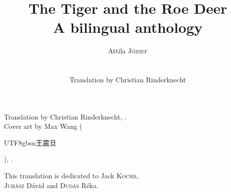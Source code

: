 \documentclass[11pt]{extbook}
\title{The Tiger and the Roe Deer\\ {\large A bilingual anthology}}
\author{{\Large Attila \textsc{József}}\\\\\\
Translation by Christian Rinderknecht}
\date{\oldstylenums{2026}}
\makeatletter
\newcommand*{\centeredornament}{\centerline{\pgfornament[width=6cm]{88}}}
\renewcommand{\tableofcontents}{%
  \def\contentsname{\empty}
  \chapter*{\contentsname}%
  \vspace*{-10em} %
  \@starttoc{toc}%
}
\newcommand{\zh}[1]{\begin{CJK}{UTF8}{gbsn}#1\end{CJK}}
\makeatother
\begin{document}
\pagestyle{empty}



\mbox{}

\newpage

\mbox{}

\newpage

\maketitle

\vspace*{\fill}

\begin{flushright}
  \textcopyright{} Translation by Christian Rinderknecht,
  .\\
  \textcopyright{} Cover art by Max Wang (\zh{王震旦}), .
\end{flushright}

\newpage

\vspace*{4cm}

\begin{flushright}
  This translation is dedicated to Jack \textsc{Kocsis}, \\
  \textsc{Juhász} Dávid and \textsc{Dudás} Réka.
\end{flushright}

\newpage
\newpage

%

\tableofcontents


\clearpage
\pagestyle{plain}


\vspace*{-15mm}
\centeredornament


\end{document}
